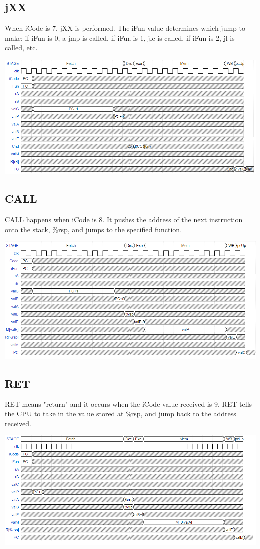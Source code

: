 \documentclass{article}
\begin{document}
\subsection{jXX}
When iCode is 7, jXX is performed. The iFun value determines which jump to make: if iFun is 0, a jmp is called, if iFun is 1, jle is called, if iFun is 2, jl is called, etc. 
\begin{center}
    \includegraphics[scale=.6]{jXXpic.png}
\end{center}
\subsection{CALL}
CALL happens when iCode is 8. It pushes the address of the next instruction onto the stack, \%rsp, and jumps to the specified function. 
\begin{center}
    \includegraphics[scale=.6]{cALLpic.png}
\end{center}
\subsection{RET}
RET means "return" and it occurs when the iCode value received is 9. RET tells the CPU to take in the value stored at \%rsp, and jump back to the address received. 
\begin{center}
    \includegraphics[scale=.6]{RETpic.png}
\end{center}
\end{document}
